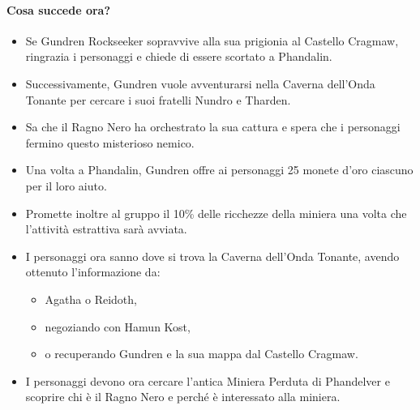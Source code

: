 \documentclass{article}
\begin{document}
\paragraph{Cosa succede ora?}
\begin{itemize}
    \item Se Gundren Rockseeker sopravvive alla sua prigionia al Castello Cragmaw, ringrazia i personaggi e chiede di essere scortato a Phandalin.
    \item Successivamente, Gundren vuole avventurarsi nella Caverna dell’Onda Tonante per cercare i suoi fratelli Nundro e Tharden.
    \item Sa che il Ragno Nero ha orchestrato la sua cattura e spera che i personaggi fermino questo misterioso nemico.
    \item Una volta a Phandalin, Gundren offre ai personaggi 25 monete d'oro ciascuno per il loro aiuto.
    \item Promette inoltre al gruppo il 10\% delle ricchezze della miniera una volta che l'attività estrattiva sarà avviata.
    \item I personaggi ora sanno dove si trova la Caverna dell’Onda Tonante, avendo ottenuto l'informazione da:
    \begin{itemize}
        \item Agatha o Reidoth,
        \item negoziando con Hamun Kost,
        \item o recuperando Gundren e la sua mappa dal Castello Cragmaw.
    \end{itemize}
    \item I personaggi devono ora cercare l'antica Miniera Perduta di Phandelver e scoprire chi è il Ragno Nero e perché è interessato alla miniera.
\end{itemize}
\end{document}
